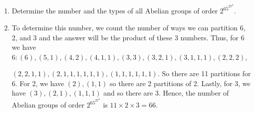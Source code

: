 \documentclass[12pt]{article}
\makeatletter
\theoremstyle{definition}
\theoremstyle{remark}
\renewenvironment{proof}[1][\proofname]{\par
  \pushQED{\qed}%
  \normalfont \topsep6\p@\@plus6\p@\relax
  \list{}{\leftmargin=0mm
          \rightmargin=4mm
          \settowidth{\itemindent}{\itshape#1}%
          \labelwidth=\itemindent
          \parsep=0pt \listparindent=\parindent 
  }
  \item[\hskip\labelsep
        \itshape
    #1\@addpunct{.}]\ignorespaces
}{%
  \popQED\endlist\@endpefalse
}
\let\oldproofname=\proofname
\renewcommand{\proofname}{\bf{\textit{\oldproofname}}}
\makeatother
\begin{document}
\begin{enumerate}[leftmargin=*]
\begin{enumerate}[label=(\alph*)]
                            \item Determine the number and the types of all Abelian groups of order $2^65^27^3$.
                                \begin{proof}
                                    To determine this number, we count the number of ways we can partition 6, 2, and 3 and the answer will be the product of these 3 numbers. Thus, for 6 we have $6:(6),(5,1),(4,2),(4,1,1),(3,3),(3,2,1),(3,1,1,1),(2,2,2)$,\par $(2,2,1,1),(2,1,1,1,1,1,1),(1,1,1,1,1,1)$. So there are 11 partitions for 6. For 2, we have $(2), (1,1)$ so there are 2 partitions of 2. Lastly, for 3, we have $(3), (2,1),(1,1,1)$ and so there are 3. Hence, the number of Abelian groups of order $2^65^27^3$ is $11\times2\times3=66$.
                                \end{proof}
                        \end{enumerate}
    \end{enumerate}
    
\end{document}
